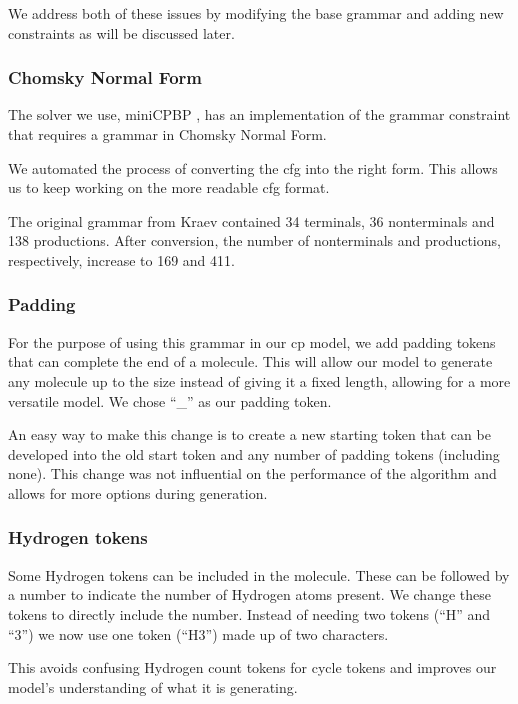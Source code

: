 \documentclass[../Document.tex]{subfiles}
\begin{document}
We address both of these issues by modifying the base grammar and adding new constraints as will be discussed later.


\subsubsection{Chomsky Normal Form}
The solver we use, miniCPBP , has an implementation of the grammar constraint that requires a grammar in Chomsky Normal Form.


We automated the process of converting the \gls{cfg} into the right form. This allows us to keep working on the more readable \gls{cfg} format.

The original grammar from Kraev contained 34 terminals, 36 nonterminals and 138 productions. After conversion, the number of nonterminals and productions, respectively, increase to 169 and 411.


\subsubsection{Padding}
For the purpose of using this grammar in our \gls{cp} model, we add padding tokens that can complete the end of a molecule. 
This will allow our model to generate any molecule up to the size instead of giving it a fixed length, allowing for a more versatile model.
We chose ``\_'' as our padding token.

An easy way to make this change is to create a new starting token that can be developed into the old start token and any number of padding tokens (including none). This change was not influential on the performance of the algorithm and allows for more options during generation.


\subsubsection{Hydrogen tokens}
Some Hydrogen tokens can be included in the molecule. These can be followed by a number to indicate the number of Hydrogen atoms present. We change these tokens to directly include the number.
Instead of needing two tokens (``H'' and ``3'') we now use one token (``H3'') made up of two characters.

This avoids confusing Hydrogen count tokens for cycle tokens and improves our model's understanding of what it is generating.
\end{document}
